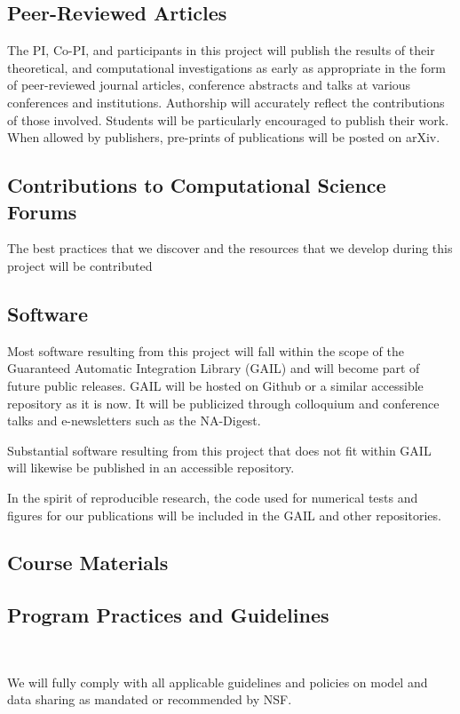 \documentclass[11pt]{NSFamsart}
\begin{document}
\subsection*{Peer-Reviewed Articles}  The PI, Co-PI, and participants in this project will publish the results of their theoretical, and computational investigations as early as appropriate in the form of peer-reviewed journal articles, conference abstracts and talks at various conferences and institutions. Authorship will accurately 
reflect the contributions of those involved.  Students will be particularly encouraged to publish their work. When allowed by publishers, pre-prints of publications will be posted on arXiv.

\subsection*{Contributions to Computational Science Forums} The best practices that we discover and the resources that we develop during this project will be contributed 

\subsection*{Software}
Most software resulting from this project will fall within the scope of the Guaranteed Automatic 
Integration Library (GAIL) and will become part of future public releases.  GAIL will be hosted on 
Github or a similar accessible repository as it is now.  It will be publicized through colloquium and 
conference talks and e-newsletters such as the NA-Digest.

Substantial software resulting from this project that does not fit within GAIL will likewise be 
published in an accessible repository.

In the spirit of reproducible research, the code used for numerical tests and figures for our 
publications will be included in the GAIL and other repositories.

\subsection*{Course Materials}

\subsection*{Program Practices and Guidelines}\ 

We will fully comply with all applicable guidelines and policies on model and data sharing as mandated or recommended by NSF.
\end{document}

